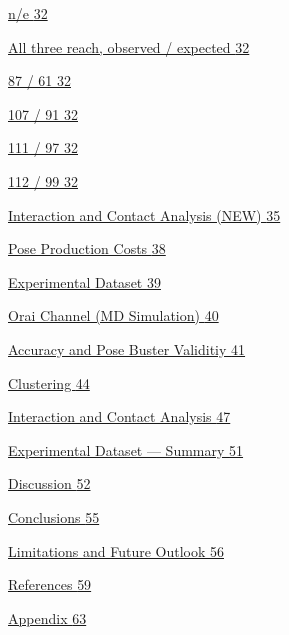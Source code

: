 \protect\hyperlink{_Toc235735927}{n/e \protect\hyperlink{_Toc235735927}{32}}

\protect\hyperlink{_Toc235735928}{All three reach, observed / expected \protect\hyperlink{_Toc235735928}{32}}

\protect\hyperlink{_Toc235735929}{87 / 61 \protect\hyperlink{_Toc235735929}{32}}

\protect\hyperlink{_Toc235735930}{107 / 91 \protect\hyperlink{_Toc235735930}{32}}

\protect\hyperlink{_Toc235735931}{111 / 97 \protect\hyperlink{_Toc235735931}{32}}

\protect\hyperlink{_Toc235735932}{112 / 99 \protect\hyperlink{_Toc235735932}{32}}

\protect\hyperlink{interaction-and-contact-analysis}{Interaction and Contact Analysis (NEW) \protect\hyperlink{interaction-and-contact-analysis}{35}}

\protect\hyperlink{_Toc235735934}{Pose Production Costs \protect\hyperlink{_Toc235735934}{38}}

\protect\hyperlink{experimental-dataset-1}{Experimental Dataset \protect\hyperlink{experimental-dataset-1}{39}}

\protect\hyperlink{orai-channel-md-simulation}{Orai Channel (MD Simulation) \protect\hyperlink{orai-channel-md-simulation}{40}}

\protect\hyperlink{posebusters-validity-1}{Accuracy and Pose Buster Validitiy \protect\hyperlink{posebusters-validity-1}{41}}

\protect\hyperlink{_Toc235735938}{Clustering \protect\hyperlink{_Toc235735938}{44}}

\protect\hyperlink{_Toc235735939}{Interaction and Contact Analysis \protect\hyperlink{_Toc235735939}{47}}

\protect\hyperlink{_Toc235735940}{Experimental Dataset --- Summary \protect\hyperlink{_Toc235735940}{51}}

\protect\hyperlink{_Toc235735941}{Discussion \protect\hyperlink{_Toc235735941}{52}}

\protect\hyperlink{conclusions}{Conclusions \protect\hyperlink{conclusions}{55}}

\protect\hyperlink{limitations-and-future-outlook}{Limitations and Future Outlook \protect\hyperlink{limitations-and-future-outlook}{56}}

\protect\hyperlink{references}{References \protect\hyperlink{references}{59}}

\protect\hyperlink{appendix}{Appendix \protect\hyperlink{appendix}{63}}

